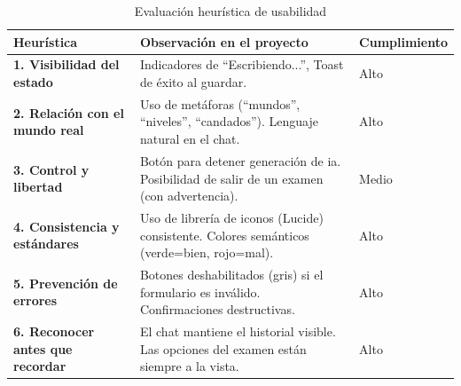 \begin{table}[h]
\centering
\small
\begin{tabularx}{0.95\textwidth}{|l|X|l|}
\hline
\textbf{Heurística} & \textbf{Observación en el proyecto} & \textbf{Cumplimiento} \\
\hline
\textbf{1. Visibilidad del estado} & Indicadores de \enquote{Escribiendo...}, Toast de éxito al guardar. & Alto \\
\hline
\textbf{2. Relación con el mundo real} & Uso de metáforas (\enquote{mundos}, \enquote{niveles}, \enquote{candados}). Lenguaje natural en el chat. & Alto \\
\hline
\textbf{3. Control y libertad} & Botón para detener generación de \gls{ia}. Posibilidad de salir de un examen (con advertencia). & Medio \\
\hline
\textbf{4. Consistencia y estándares} & Uso de librería de iconos (Lucide) consistente. Colores semánticos (verde=bien, rojo=mal). & Alto \\
\hline
\textbf{5. Prevención de errores} & Botones deshabilitados (gris) si el formulario es inválido. Confirmaciones destructivas. & Alto \\
\hline
\textbf{6. Reconocer antes que recordar} & El chat mantiene el historial visible. Las opciones del examen están siempre a la vista. & Alto \\
\hline
\end{tabularx}
\caption{Evaluación heurística de usabilidad}
\label{tab:usabilidad}
\end{table}
